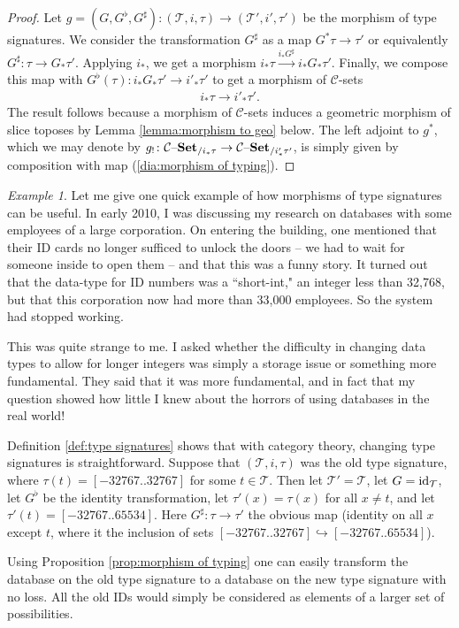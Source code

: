 \documentclass{amsart}
\def\tn{\textnormal}
\def\mc{\mathcal}
\def\to{\rightarrow}
\def\taking{\colon}
\def\inj{\hookrightarrow}
\newcommand{\To}[1]{\xrightarrow{#1}}
\def\id{\tn{id}}
\def\set{{\text \textendash}{\bf Set}}
\def\mcC{\mc{C}}
\def\mcT{\mc{T}}
\theoremstyle{remark}
\newtheorem{example}[theorem]{Example}
\theoremstyle{definition}
\begin{document}
\begin{proof}

Let $g=(G,G^\flat,G^\sharp)\taking(\mcT,i,\tau)\to(\mcT',i',\tau')$ be the morphism of type signatures. We consider the transformation $G^\sharp$ as a map $G^*\tau\to\tau'$ or equivalently $G^\sharp\taking\tau\to G_*\tau'$.  Applying $i_*$, we get a morphism $i_*\tau\To{i_*G^\sharp}i_*G_*\tau'$.  Finally, we compose this map with $G^\flat(\tau)\taking i_*G_*\tau'\to i'_*\tau'$ to get a morphism of $\mcC$-sets \begin{align}\label{dia:morphism of typing}i_*\tau\to i'_*\tau'.\end{align}  The result follows because a morphism of $\mcC$-sets induces a geometric morphism of slice toposes by Lemma \ref{lemma:morphism to geo} below.  The left adjoint to $g^*$, which we may denote by $g_!\taking\mcC\set_{/i_*\tau}\to\mcC\set_{/i'_*\tau'}$, is simply given by composition with map (\ref{dia:morphism of typing}).

\end{proof}

\begin{example}

Let me give one quick example of how morphisms of type signatures can be useful.  In early 2010, I was discussing my research on databases with some employees of a large corporation.  On entering the building, one mentioned that their ID cards no longer sufficed to unlock the doors -- we had to wait for someone inside to open them -- and that this was a funny story.  It turned out that the data-type for ID numbers was a ``short-int," an integer less than 32,768, but that this corporation now had more than 33,000 employees.  So the system had stopped working.

This was quite strange to me.  I asked whether the difficulty in changing data types to allow for longer integers was simply a storage issue or something more fundamental.  They said that it was more fundamental, and in fact that my question showed how little I knew about the horrors of using databases in the real world!

Definition \ref{def:type signatures} shows that with category theory, changing type signatures is straightforward.  Suppose that $(\mcT,i,\tau)$ was the old type signature, where $\tau(t)=[-32767 .. 32767]$ for some $t\in\mcT$.  Then let $\mcT'=\mcT$, let $G=\id_\mcT$, let $G^\flat$ be the identity transformation, let $\tau'(x)=\tau(x)$ for all $x\neq t$, and let $\tau'(t)=[-32767.. 65534]$.  Here $G^\sharp\taking\tau\to\tau'$ the obvious map (identity on all $x$ except $t$, where it the inclusion of sets $[-32767.. 32767]\inj[-32767 .. 65534]$).  

Using Proposition \ref{prop:morphism of typing} one can easily transform the database on the old type signature to a database on the new type signature with no loss.  All the old IDs would simply be considered as elements of a larger set of possibilities. 

\end{example}
\end{document}
